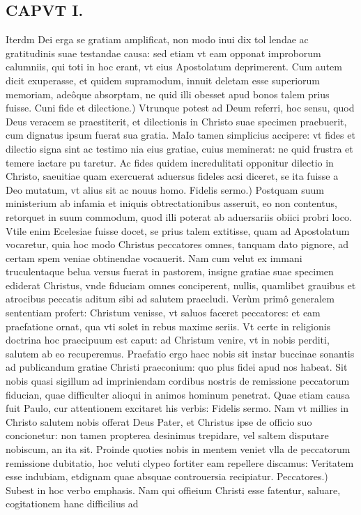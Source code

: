 \documentclass{article}
\begin{document}
\begin{pages}
\section*{CAPVT I. }
\marginpar{[ p.11 ]}\pstart Iterdm Dei erga se gratiam amplificat, non modo inui dix tol lendae ac gratitudinis suae testandae causa: sed etiam vt eam opponat improborum calumniis, qui toti in hoc erant, vt eius Apostolatum deprimerent. Cum autem dicit exuperasse, et quidem supramodum, innuit deletam esse superiorum memoriam, adeôque absorptam, ne quid illi obesset apud bonos talem prius fuisse.  \pend\pstart Cuni fide et dilectione.) Vtrunque potest ad Deum referri, hoc sensu, quod Deus veracem se praestiterit, et dilectionis in Christo suae specimen praebuerit, cum dignatus ipsum fuerat sua gratia. MaIo tamen simplicius accipere: vt fides et dilectio signa sint ac testimo nia eius gratiae, cuius meminerat: ne quid frustra et temere iactare pu taretur. Ac fides quidem incredulitati opponitur dilectio in Christo, saeuitiae quam exercuerat aduersus fideles acsi diceret, se ita fuisse a Deo mutatum, vt alius sit ac nouus homo.  \pend\pstart Fidelis sermo.) Postquam suum ministerium ab infamia et iniquis obtrectationibus asseruit, eo non contentus, retorquet in suum commodum, quod illi poterat ab aduersariis obiici probri loco. Vtile enim Ecelesiae fuisse docet, se prius talem extitisse, quam ad Apostolatum vocaretur, quia hoc modo Christus peccatores omnes, tanquam dato pignore, ad certam spem veniae obtinendae vocauerit. Nam cum velut ex immani truculentaque belua versus fuerat in pastorem, insigne gratiae suae specimen ediderat Christus, vnde fiduciam omnes conciperent, nullis, quamlibet grauibus et atrocibus peccatis aditum sibi ad salutem praecludi. Verùm primô generalem sententiam profert: Christum venisse, vt saluos faceret peccatores: et eam praefatione ornat, qua vti solet in rebus maxime seriis. Vt certe in religionis doctrina hoc praecipuum est caput: ad Christum venire, vt in nobis perditi, salutem ab eo recuperemus. Praefatio ergo haec nobis sit instar buccinae sonantis ad publicandum gratiae Christi praeconium: quo plus fidei apud nos habeat. Sit nobis quasi sigillum ad impriniendam cordibus nostris de remissione peccatorum fiducian, quae difficulter alioqui in animos hominum penetrat. Quae etiam causa fuit Paulo, cur attentionem excitaret his verbis: Fidelis sermo. Nam vt millies in Christo salutem nobis offerat Deus Pater, et Christus ipse de officio suo concionetur: non tamen propterea desinimus trepidare, vel saltem disputare nobiscum, an ita sit. Proinde quoties nobis in mentem veniet vlla de peccatorum remissione dubitatio, hoc veluti clypeo fortiter eam repellere discamus: Veritatem esse indubiam, etdignam quae absquae controuersia recipiatur.  \pend\pstart Peccatores.) Subest in hoc verbo emphasis. Nam qui offieium Christi esse fatentur, saluare, cogitationem hanc difficilius ad\pend

\end{pages}
\end{document}
